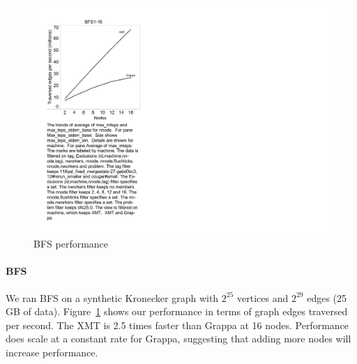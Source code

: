 \begin{figure}[tH]
\begin{center}
  \includegraphics[width=0.95\columnwidth]{figs/bfs_performance}
\begin{minipage}{0.95\columnwidth}
  \caption{\label{fig:bfs-performance} BFS performance}
\end{minipage}
\vspace{-3ex}
\end{center}
\end{figure}

\paragraph{BFS}

We ran BFS on a synthetic Kronecker graph with $2^{25}$ vertices and
$2^{29}$ edges (25 GB of data). Figure~\ref{fig:bfs-performance} shows
our performance in terms of graph edges traversed per second. The XMT
is 2.5 times faster than Grappa at 16 nodes.  Performance does scale at a constant rate for Grappa, suggesting that adding more nodes will increase performance.

